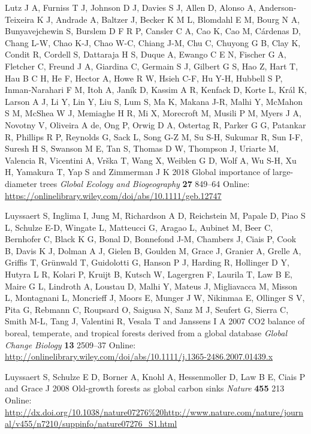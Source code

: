 \documentclass[
]{article}
\newlength{\cslhangindent}
\newenvironment{cslreferences}%
  {\setlength{\parindent}{0pt}%
  \everypar{\setlength{\hangindent}{\cslhangindent}}\ignorespaces}%
  {\par}
\begin{document}
\begin{cslreferences}
\leavevmode\hypertarget{ref-lutz_global_2018}{}%
Lutz J A, Furniss T J, Johnson D J, Davies S J, Allen D, Alonso A,
Anderson‐Teixeira K J, Andrade A, Baltzer J, Becker K M L, Blomdahl E M,
Bourg N A, Bunyavejchewin S, Burslem D F R P, Cansler C A, Cao K, Cao M,
Cárdenas D, Chang L-W, Chao K-J, Chao W-C, Chiang J-M, Chu C, Chuyong G
B, Clay K, Condit R, Cordell S, Dattaraja H S, Duque A, Ewango C E N,
Fischer G A, Fletcher C, Freund J A, Giardina C, Germain S J, Gilbert G
S, Hao Z, Hart T, Hau B C H, He F, Hector A, Howe R W, Hsieh C-F, Hu
Y-H, Hubbell S P, Inman‐Narahari F M, Itoh A, Janík D, Kassim A R,
Kenfack D, Korte L, Král K, Larson A J, Li Y, Lin Y, Liu S, Lum S, Ma K,
Makana J-R, Malhi Y, McMahon S M, McShea W J, Memiaghe H R, Mi X,
Morecroft M, Musili P M, Myers J A, Novotny V, Oliveira A de, Ong P,
Orwig D A, Ostertag R, Parker G G, Patankar R, Phillips R P, Reynolds G,
Sack L, Song G-Z M, Su S-H, Sukumar R, Sun I-F, Suresh H S, Swanson M E,
Tan S, Thomas D W, Thompson J, Uriarte M, Valencia R, Vicentini A, Vrška
T, Wang X, Weiblen G D, Wolf A, Wu S-H, Xu H, Yamakura T, Yap S and
Zimmerman J K 2018 Global importance of large-diameter trees
\emph{Global Ecology and Biogeography} \textbf{27} 849--64 Online:
\url{https://onlinelibrary.wiley.com/doi/abs/10.1111/geb.12747}

\leavevmode\hypertarget{ref-luyssaert_co2_2007}{}%
Luyssaert S, Inglima I, Jung M, Richardson A D, Reichstein M, Papale D,
Piao S L, Schulze E-D, Wingate L, Matteucci G, Aragao L, Aubinet M, Beer
C, Bernhofer C, Black K G, Bonal D, Bonnefond J-M, Chambers J, Ciais P,
Cook B, Davis K J, Dolman A J, Gielen B, Goulden M, Grace J, Granier A,
Grelle A, Griffis T, Grünwald T, Guidolotti G, Hanson P J, Harding R,
Hollinger D Y, Hutyra L R, Kolari P, Kruijt B, Kutsch W, Lagergren F,
Laurila T, Law B E, Maire G L, Lindroth A, Loustau D, Malhi Y, Mateus J,
Migliavacca M, Misson L, Montagnani L, Moncrieff J, Moors E, Munger J W,
Nikinmaa E, Ollinger S V, Pita G, Rebmann C, Roupsard O, Saigusa N, Sanz
M J, Seufert G, Sierra C, Smith M-L, Tang J, Valentini R, Vesala T and
Janssens I A 2007 CO2 balance of boreal, temperate, and tropical forests
derived from a global database \emph{Global Change Biology} \textbf{13}
2509--37 Online:
\url{http://onlinelibrary.wiley.com/doi/abs/10.1111/j.1365-2486.2007.01439.x}

\leavevmode\hypertarget{ref-luyssaert_old-growth_2008}{}%
Luyssaert S, Schulze E D, Borner A, Knohl A, Hessenmoller D, Law B E,
Ciais P and Grace J 2008 Old-growth forests as global carbon sinks
\emph{Nature} \textbf{455} 213 Online:
\url{http://dx.doi.org/10.1038/nature07276\%20http://www.nature.com/nature/journal/v455/n7210/suppinfo/nature07276_S1.html}


\end{cslreferences}
\end{document}
